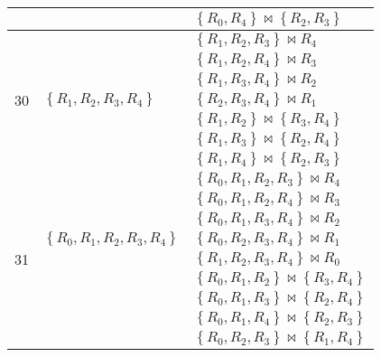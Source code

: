 \documentclass[12pt]{scrartcl}
\begin{document}
\begin{enumerate}
\begin{table}[H]
\begin{center}
\begin{tabular}{lll}
								&																			& $\left\lbrace R_{0}, R_{4}\right\rbrace \bowtie \left\lbrace R_{2}, R_{3}\right\rbrace $ \\\hline
			\multirow{7}{*}{30}	&\multirow{7}{*}{$\left\lbrace R_{1}, R_{2}, R_{3}, R_{4}\right\rbrace$}	& $\left\lbrace R_{1}, R_{2}, R_{3}\right\rbrace \bowtie R_{4}$ \\
								&																			& $\left\lbrace R_{1}, R_{2}, R_{4}\right\rbrace \bowtie R_{3}$ \\
								&																			& $\left\lbrace R_{1}, R_{3}, R_{4}\right\rbrace \bowtie R_{2}$ \\
								&																			& $\left\lbrace R_{2}, R_{3}, R_{4}\right\rbrace \bowtie R_{1}$ \\
								&																			& $\left\lbrace R_{1}, R_{2}\right\rbrace \bowtie \left\lbrace R_{3}, R_{4}\right\rbrace $ \\
								&																			& $\left\lbrace R_{1}, R_{3}\right\rbrace \bowtie \left\lbrace R_{2}, R_{4}\right\rbrace $ \\
								&																			& $\left\lbrace R_{1}, R_{4}\right\rbrace \bowtie \left\lbrace R_{2}, R_{3}\right\rbrace $ \\\hline
			\multirow{15}{*}{31}	&\multirow{7}{*}{$\left\lbrace R_{0}, R_{1}, R_{2}, R_{3}, R_{4}\right\rbrace$}	& $\left\lbrace R_{0}, R_{1}, R_{2}, R_{3}\right\rbrace \bowtie R_{4}$\\
									&																				& $\left\lbrace R_{0}, R_{1}, R_{2}, R_{4}\right\rbrace \bowtie R_{3}$\\
									&																				& $\left\lbrace R_{0}, R_{1}, R_{3}, R_{4}\right\rbrace \bowtie R_{2}$\\
									&																				& $\left\lbrace R_{0}, R_{2}, R_{3}, R_{4}\right\rbrace \bowtie R_{1}$\\
									&																				& $\left\lbrace R_{1}, R_{2}, R_{3}, R_{4}\right\rbrace \bowtie R_{0}$\\
									&																				& $\left\lbrace R_{0}, R_{1}, R_{2}\right\rbrace \bowtie \left\lbrace R_{3}, R_{4}\right\rbrace $ \\
									&																				& $\left\lbrace R_{0}, R_{1}, R_{3}\right\rbrace \bowtie \left\lbrace R_{2}, R_{4}\right\rbrace $ \\
									&																				& $\left\lbrace R_{0}, R_{1}, R_{4}\right\rbrace \bowtie \left\lbrace R_{2}, R_{3}\right\rbrace $ \\
									&																				& $\left\lbrace R_{0}, R_{2}, R_{3}\right\rbrace \bowtie \left\lbrace R_{1}, R_{4}\right\rbrace $ \\ 

\end{tabular}
\end{center}
\end{table}
\end{enumerate}
\end{document}
